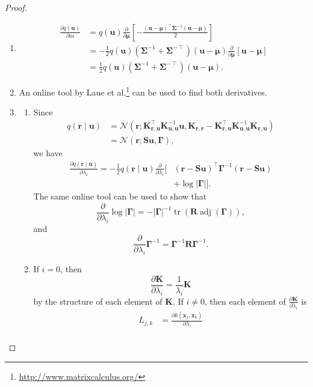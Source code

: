 \documentclass{mpaper}
\DeclareMathOperator{\adj}{adj}
\DeclareMathOperator{\tr}{tr}
\newcommand{\Kuu}{\mathbf{K}_{\mathbf{u},\mathbf{u}}}
\newcommand{\Krr}{\mathbf{K}_{\mathbf{r},\mathbf{r}}}
\newcommand{\Kru}{\mathbf{K}_{\mathbf{r},\mathbf{u}}}
\newcommand{\dm}{\frac{\partial}{\partial\bm\mu}}
\newcommand{\dl}{\frac{\partial}{\partial \lambda_i}}
\begin{document}
\derivatives*
\begin{proof}
  \leavevmode
  \begin{enumerate}
  \item
    \begin{align*}
      \frac{\partial q(\mathbf{u})}{\partial m} &= q(\mathbf{u})\dm\left[-\frac{(\mathbf{u} - \bm\mu)^\intercal\bm\Sigma^{-1}(\mathbf{u} - \bm\mu)}{2}\right] \\
                                                &= -\frac{1}{2}q(\mathbf{u})(\bm\Sigma^{-1} + \bm\Sigma^{-\intercal})(\mathbf{u} - \bm\mu)\dm[\mathbf{u} - \bm\mu] \\
                                                &= \frac{1}{2}q(\mathbf{u})(\bm\Sigma^{-1} + \bm\Sigma^{-\intercal})(\mathbf{u} - \bm\mu).
    \end{align*}
  \item An online tool by Laue et
    al.\footnote{\url{http://www.matrixcalculus.org/}}
    \cite{DBLP:conf/nips/LaueMG18} can be used to find both derivatives.
  \item
    \begin{enumerate}
    \item Since
    \begin{align*}
      q(\mathbf{r} \mid \mathbf{u}) &= \mathcal{N}(\mathbf{r};
      \Kru^\intercal\Kuu^{-1}\mathbf{u}, \Krr - \Kru^\intercal \Kuu^{-1}\Kru) \\
      &= \mathcal{N}(\mathbf{r}; \mathbf{Su}, \bm\Gamma),
    \end{align*}
    we have
    \begin{align*}
      \frac{\partial q(\mathbf{r} \mid \mathbf{u})}{\partial \lambda_i} =
      -\frac{1}{2}q(\mathbf{r} \mid \mathbf{u}) \dl[&(\mathbf{r} -
      \mathbf{Su})^\intercal\bm\Gamma^{-1}(\mathbf{r} - \mathbf{Su}) \\
      &+ \log|\bm\Gamma|].
    \end{align*}
    The same online tool can be used to show that
    \[
      \dl \log|\bm\Gamma| = -|\bm\Gamma|^{-1}\tr(\mathbf{R}\adj(\bm\Gamma)),
    \]
    and
    \[
      \dl \bm\Gamma^{-1} = \bm\Gamma^{-1}\mathbf{R}\bm\Gamma^{-1}.
    \]
  \item
    If $i=0$, then
    \[
      \frac{\partial \mathbf{K}}{\partial \lambda_i} =
      \frac{1}{\lambda_i}\mathbf{K}
    \]
    by the structure of each element of $\mathbf{K}$. If $i \ne 0$, then each
    element of $\frac{\partial \mathbf{K}}{\partial \lambda_i}$ is
    \begin{align*}
      L_{j,k} &= \frac{\partial k(\mathbf{x}_j, \mathbf{x}_k)}{\partial \lambda_i} \\

\end{align*}
\end{enumerate}
\end{enumerate}
\end{proof}
\end{document}
